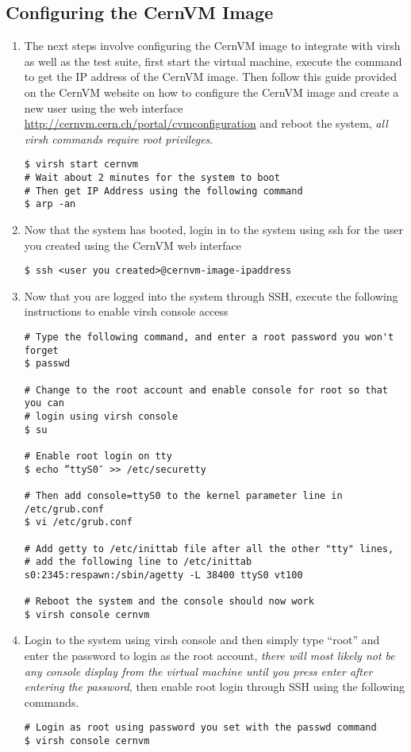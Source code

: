 \subsection{Configuring the CernVM Image}
\begin{enumerate}
\item The next steps involve configuring the CernVM image to integrate with virsh as well as the test suite, first
start the virtual machine, execute the command to get the IP address of the CernVM image. Then follow this guide
provided on the CernVM website on how to configure the CernVM image and create a new user using the web interface \url{http://cernvm.cern.ch/portal/cvmconfiguration} and reboot the system, \emph{all virsh commands require root privileges}.
\begin{lstlisting}
$ virsh start cernvm
# Wait about 2 minutes for the system to boot 
# Then get IP Address using the following command
$ arp -an
\end{lstlisting}

\item Now that the system has booted, login in to the system using ssh for the user you created using the CernVM web interface
\begin{lstlisting}
$ ssh <user you created>@cernvm-image-ipaddress
\end{lstlisting}

\item Now that you are logged into the system through SSH, execute the following instructions to enable virsh console access
\lstset{caption= Enable Virsh Console Access}
\begin{lstlisting}
# Type the following command, and enter a root password you won't forget
$ passwd

# Change to the root account and enable console for root so that you can 
# login using virsh console
$ su

# Enable root login on tty
$ echo “ttyS0″ >> /etc/securetty

# Then add console=ttyS0 to the kernel parameter line in /etc/grub.conf
$ vi /etc/grub.conf

# Add getty to /etc/inittab file after all the other "tty" lines, 
# add the following line to /etc/inittab
s0:2345:respawn:/sbin/agetty -L 38400 ttyS0 vt100

# Reboot the system and the console should now work
$ virsh console cernvm
\end{lstlisting}

\item Login to the system using virsh console and then simply type ``root'' and enter the password to login as the 
root account, \emph{there will most likely not be any console display from the virtual machine until you press 
enter after entering the password}, then enable root login through SSH using the following commands.
\lstset{caption= Enable SSH Root Login}
\begin{lstlisting}
# Login as root using password you set with the passwd command
$ virsh console cernvm


\end{lstlisting}
\end{enumerate}
